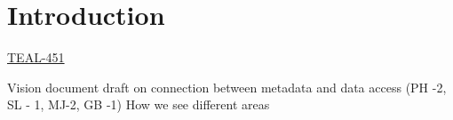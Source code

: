 \section{Introduction}\label{sec:intro}

\href{https://jira.skatelescope.org/browse/TEAL-451}{TEAL-451}

Vision document draft on connection between metadata and data access (PH -2, SL - 1, MJ-2, GB -1) How we see different areas

